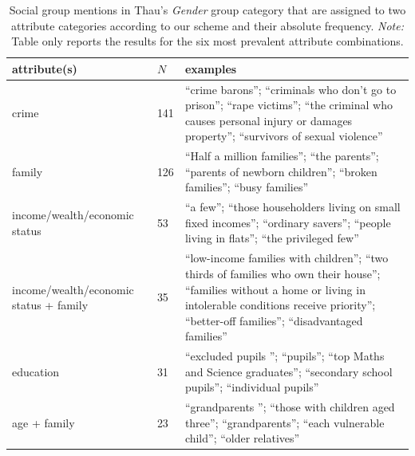 \begin{table}[!th]
\centering
\caption{Social group mentions in Thau's \emph{Gender} group category that are assigned to two attribute categories according to our scheme and their absolute frequency. \emph{Note:} Table only reports the results for the six most prevalent attribute combinations.}
\label{tableC10}
\begin{tabular}{p{2.2in} l L{3in}}
\toprule
attribute(s) & $N$ & examples \\
\midrule
crime & 141 & ``crime barons''; ``criminals who don’t go to prison''; ``rape victims''; ``the criminal who causes personal injury or damages property''; ``survivors of sexual violence'' \\
family & 126 & ``Half a million families''; ``the parents''; ``parents of newborn children''; ``broken families''; ``busy families'' \\
income/wealth/economic status & 53 & ``a few''; ``those householders living on small fixed incomes''; ``ordinary savers''; ``people living in flats''; ``the privileged few'' \\
income/wealth/economic status + family & 35 & ``low-income families with children''; ``two thirds of families who own their house''; ``families without a home or living in intolerable conditions receive priority''; ``better-off families''; ``disadvantaged families'' \\
education & 31 & ``excluded pupils ''; ``pupils''; ``top Maths and Science graduates''; ``secondary school pupils''; ``individual pupils'' \\
age + family & 23 & ``grandparents ''; ``those with children aged three''; ``grandparents''; ``each vulnerable child''; ``older relatives'' \\
\bottomrule
\end{tabular}
\end{table}
